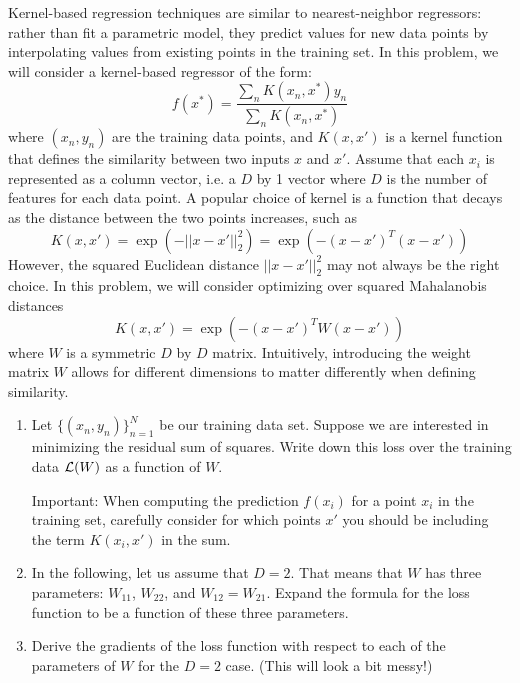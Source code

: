 \documentclass[submit]{harvardml}
\begin{document}


\begin{problem}

Kernel-based regression techniques are similar to nearest-neighbor
regressors: rather than fit a parametric model, they predict values
for new data points by interpolating values from existing points in
the training set.  In this problem, we will consider a kernel-based
regressor of the form:
\begin{equation*}
  f(x^*) = \frac{ \sum_{n} K(x_n,x^*) y_n  }{ \sum_{n} K(x_n,x^*) } 
\end{equation*}
where $(x_n,y_n)$ are the training data points, and $K(x,x')$ is a
kernel function that defines the similarity between two inputs $x$ and
$x'$. Assume that each $x_i$ is represented as a column vector, i.e. a
$D$ by 1 vector where $D$ is the number of features for each data
point. A popular choice of kernel is a function that decays as the
distance between the two points increases, such as
\begin{equation*}
  K(x,x') = \exp(-||x-x'||^2_2) = \exp(-(x-x')^T (x-x') ) 
\end{equation*} 
However, the squared Euclidean distance $||x-x'||^2_2$ may not always
be the right choice.  In this problem, we will consider optimizing
over squared Mahalanobis distances
\begin{equation*}
  K(x,x') = \exp(-(x-x')^T W (x-x') )
  \label{eqn:distance}
\end{equation*} 
where $W$ is a symmetric $D$ by $D$ matrix.  Intuitively, introducing
the weight matrix $W$ allows for different dimensions to matter
differently when defining similarity.

\begin{enumerate}

\item Let $\{(x_n,y_n)\}_{n=1}^N$ be our training data set.  Suppose
  we are interested in minimizing the residual sum of squares.  Write down this
  loss over the training data $\mathcal{L}(W)$ as a function of $W$.

  Important: When computing the prediction $f(x_i)$ for a point $x_i$
  in the training set, carefully consider for which points $x'$ you should be including
  the term $K(x_i,x')$ in the sum.
  
\item In the following, let us assume that $D = 2$.  That means that
  $W$ has three parameters: $W_{11}$, $W_{22}$, and $W_{12} = W_{21}$.
  Expand the formula for the loss function to be a function of these
  three parameters.
  
 \item Derive the gradients of the loss function with respect to each of the parameters of $W$ for the $D=2$ case. (This will look a bit messy!)



\end{enumerate}
\end{problem}
\end{document}
